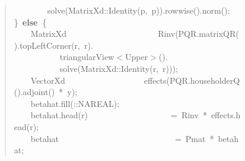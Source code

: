 \documentclass[shortnames,article]{jss}
\newcommand{\hlstd}[1]{\textcolor[rgb]{0,0,0}{#1}}
\newcommand{\hlopt}[1]{\textcolor[rgb]{0,0,0}{#1}}
\newcommand{\hlkwa}[1]{\textcolor[rgb]{0.61,0.13,0.93}{\bf{#1}}}
\newcommand{\hlkwd}[1]{\textcolor[rgb]{0,0,0}{#1}}
\begin{document}
\begin{figure}[htb]
\begin{quote}
    \hlstd{}\hlstd{\ \ \ \ \ \ \ \ }\hlstd{}\hlkwd{solve}\hlstd{}\hlopt{(}\hlstd{MatrixXd}\hlopt{::}\hlstd{}\hlkwd{Identity}\hlstd{}\hlopt{(}\hlstd{p}\hlopt{,\ }\hlstd{p}\hlopt{)).}\hlstd{}\hlkwd{rowwise}\hlstd{}\hlopt{().}\hlstd{}\hlkwd{norm}\hlstd{}\hlopt{();}\hspace*{\fill}\\
    \hlstd{}\hlopt{\}\ }\hlstd{}\hlkwa{else\ }\hlstd{}\hlopt{\{}\hspace*{\fill}\\
    \hlstd{}\hlstd{\ \ \ \ }\hlstd{MatrixXd}\hlstd{\ \ \ \ \ \ \ \ \ \ \ \ \ \ \ \ \ \ \ \ \ \ }\hlstd{}\hlkwd{Rinv}\hlstd{}\hlopt{(}\hlstd{PQR}\hlopt{.}\hlstd{}\hlkwd{matrixQR}\hlstd{}\hlopt{().}\hlstd{}\hlkwd{topLeftCorner}\hlstd{}\hlopt{(}\hlstd{r}\hlopt{,\ }\hlstd{r}\hlopt{).}\hspace*{\fill}\\
    \hlstd{}\hlstd{\ \ \ \ \ \ \ \ \ \ \ }\hlstd{triangularView}\hlopt{$<$}\hlstd{Upper}\hlopt{$>$().}\hspace*{\fill}\\
    \hlstd{}\hlstd{\ \ \ \ \ \ \ \ \ \ \ }\hlstd{}\hlkwd{solve}\hlstd{}\hlopt{(}\hlstd{MatrixXd}\hlopt{::}\hlstd{}\hlkwd{Identity}\hlstd{}\hlopt{(}\hlstd{r}\hlopt{,\ }\hlstd{r}\hlopt{)));}\hspace*{\fill}\\
    \hlstd{}\hlstd{\ \ \ \ }\hlstd{VectorXd}\hlstd{\ \ \ \ \ \ \ \ \ \ \ \ \ \ \ \ \ \ \ }\hlstd{}\hlkwd{effects}\hlstd{}\hlopt{(}\hlstd{PQR}\hlopt{.}\hlstd{}\hlkwd{householderQ}\hlstd{}\hlopt{().}\hlstd{}\hlkwd{adjoint}\hlstd{}\hlopt{()\ {*}\ }\hlstd{y}\hlopt{);}\hspace*{\fill}\\
    \hlstd{}\hlstd{\ \ \ \ }\hlstd{betahat}\hlopt{.}\hlstd{}\hlkwd{fill}\hlstd{}\hlopt{(::}\hlstd{NA\textunderscore REAL}\hlopt{);}\hspace*{\fill}\\
    \hlstd{}\hlstd{\ \ \ \ }\hlstd{betahat}\hlopt{.}\hlstd{}\hlkwd{head}\hlstd{}\hlopt{(}\hlstd{r}\hlopt{)}\hlstd{\ \ \ \ \ \ \ \ \ \ \ \ \ \ \ \ \ \ \ \ }\hlopt{=\ }\hlstd{Rinv\ }\hlopt{{*}\ }\hlstd{effects}\hlopt{.}\hlstd{}\hlkwd{head}\hlstd{}\hlopt{(}\hlstd{r}\hlopt{);}\hspace*{\fill}\\
    \hlstd{}\hlstd{\ \ \ \ }\hlstd{betahat}\hlstd{\ \ \ \ \ \ \ \ \ \ \ \ \ \ \ \ \ \ \ \ \ \ \ \ \ \ \ \ }\hlstd{}\hlopt{=\ }\hlstd{Pmat\ }\hlopt{{*}\ }\hlstd{betahat}\hlopt{;}\hspace*{\fill}\\

\end{quote}
\end{figure}
\end{document}
